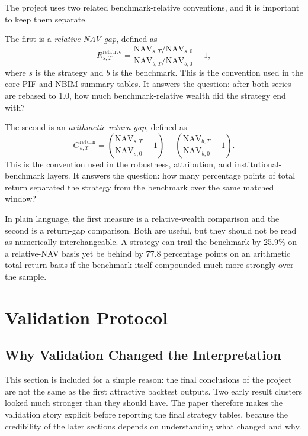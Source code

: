 \documentclass[conference]{IEEEtran}
\begin{document}
The project uses two related benchmark-relative conventions, and it is important to keep them separate.

The first is a \emph{relative-NAV gap}, defined as
\begin{equation}
R^{\text{relative}}_{s,T}=\frac{\text{NAV}_{s,T}/\text{NAV}_{s,0}}{\text{NAV}_{b,T}/\text{NAV}_{b,0}}-1,
\end{equation}
where $s$ is the strategy and $b$ is the benchmark. This is the convention used in the core PIF and NBIM summary tables. It answers the question: after both series are rebased to 1.0, how much benchmark-relative wealth did the strategy end with?

The second is an \emph{arithmetic return gap}, defined as
\begin{equation}
G^{\text{return}}_{s,T}=\left(\frac{\text{NAV}_{s,T}}{\text{NAV}_{s,0}}-1\right)-\left(\frac{\text{NAV}_{b,T}}{\text{NAV}_{b,0}}-1\right).
\end{equation}
This is the convention used in the robustness, attribution, and institutional-benchmark layers. It answers the question: how many percentage points of total return separated the strategy from the benchmark over the same matched window?

In plain language, the first measure is a relative-wealth comparison and the second is a return-gap comparison. Both are useful, but they should not be read as numerically interchangeable. A strategy can trail the benchmark by 25.9\% on a relative-NAV basis yet be behind by 77.8 percentage points on an arithmetic total-return basis if the benchmark itself compounded much more strongly over the sample.

\section{Validation Protocol}

\subsection{Why Validation Changed the Interpretation}

This section is included for a simple reason: the final conclusions of the project are not the same as the first attractive backtest outputs. Two early result clusters looked much stronger than they should have. The paper therefore makes the validation story explicit before reporting the final strategy tables, because the credibility of the later sections depends on understanding what changed and why.
\end{document}
